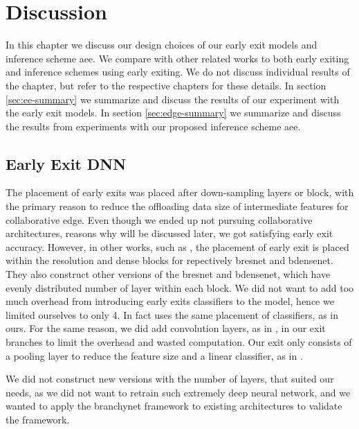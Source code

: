 \hypertarget{discussion}{%
\chapter{Discussion}\label{ch:discussion}}

In this chapter we discuss our design choices of our early exit models and inference scheme \gls{aee}. We compare with other related works to both early exiting and inference schemes using early exiting. We do not discuss individual results of the chapter, but refer to the respective chapters for these details. In section \ref{sec:ee-summary} we summarize and discuss the results of our experiment with the early exit models. In section \ref{sec:edge-summary} we summarize and discuss the results from experiments with our proposed inference scheme \gls{aee}.


\section*{Early Exit DNN}

The placement of early exits was placed after down-sampling layers or block, with the primary reason to reduce the offloading data size of intermediate features for collaborative edge. Even though we ended up not pursuing collaborative architectures, reasons why will be discussed later, we got satisfying early exit accuracy. However, in other works, such as \cite{huang_multi-scale_2017}, the placement of early exit is placed within the resolution and dense blocks for repectively \gls{bresnet} and \gls{bdensenet}. They also construct other versions of the \gls{bresnet} and \gls{bdensenet}, which have evenly distributed number of layer within each block. We did not want to add too much overhead from introducing early exits classifiers to the model, hence we limited ourselves to only 4. In fact \cite{berestizshevsky_sacrificing_2019} uses the same placement of classifiers, as in ours. For the same reason, we did add convolution layers, as in \cite{teerapittayanon_branchynet:_2016}, in our exit branches to limit the overhead and wasted computation. Our exit only consists of a pooling layer to reduce the feature size and a linear classifier, as in \cite{kaya_shallow-deep_nodate}. 

We did not construct new versions with the number of layers, that suited our needs, as we did not want to retrain such extremely deep neural network, and we wanted to apply the \gls{branchynet} framework to existing architectures to validate the framework.


